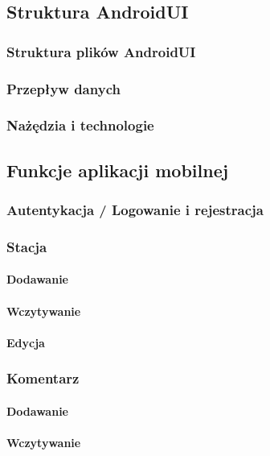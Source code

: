 \subsection{Struktura AndroidUI}
\subsubsection{Struktura plików AndroidUI}
\subsubsection{Przepływ danych}
\subsubsection{Nażędzia i technologie}
\subsection{Funkcje aplikacji mobilnej}
\subsubsection{Autentykacja / Logowanie i rejestracja}
\subsubsection{Stacja}
\paragraph{Dodawanie}
\paragraph{Wczytywanie}
\paragraph{Edycja}
\subsubsection{Komentarz}
\paragraph{Dodawanie}
\paragraph{Wczytywanie}
